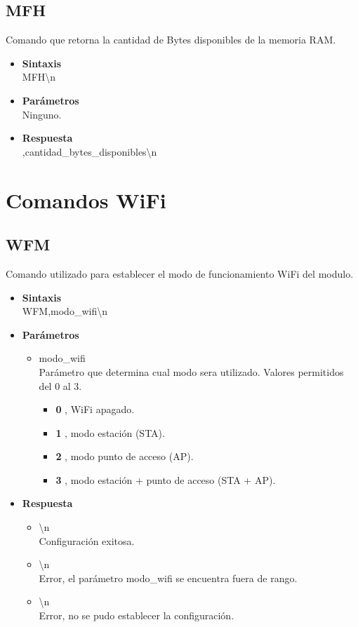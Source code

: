 \documentclass[a4paper,spanish]{article}
\begin{document}
\subsection{MFH}
Comando que retorna la cantidad de Bytes disponibles de la memoria RAM.
\begin{itemize}
	\item \textbf{Sintaxis}\\
	{\ttfamily MFH\textbackslash n}
	\item \textbf{Parámetros}\\
	Ninguno.
	\item \textbf{Respuesta}\\
	{,cantidad\_bytes\_disponibles\textbackslash n}
\end{itemize}


\section{Comandos WiFi}

\subsection{WFM}
Comando utilizado para establecer el modo de funcionamiento WiFi del modulo. 
\begin{itemize}
	\item \textbf{Sintaxis}\\
	{\ttfamily WFM,modo\_wifi\textbackslash n}
	\item \textbf{Parámetros}
	\begin{itemize}
		\item{\ttfamily modo\_wifi}\\
		Parámetro que determina cual modo sera utilizado. Valores permitidos del 0 al 3. 
		\begin{itemize}
			\item \textbf{0} , WiFi apagado. 
			\item \textbf{1} , modo estación (STA).
			\item \textbf{2} , modo punto de acceso (AP).
			\item \textbf{3} , modo estación + punto de acceso (STA + AP).
		\end{itemize}
	\end{itemize}
	\item \textbf{Respuesta}
	\begin{itemize}
		\item{\textbackslash n} \\
		Configuración exitosa.
		\item{\textbackslash n} \\
		Error, el parámetro {\ttfamily modo\_wifi} se encuentra fuera de rango.
		\item{\textbackslash n} \\
		Error, no se pudo establecer la configuración.
	\end{itemize}
\end{itemize}
\end{document}
